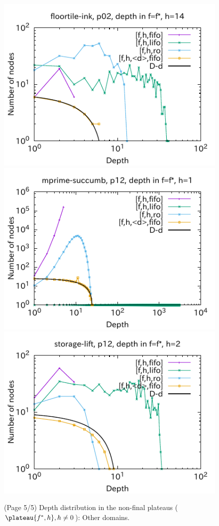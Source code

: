 \begin{figure}[htbp]
\includegraphics{img/output-lmcut/floortile-ink/p02-14.pdf}
\includegraphics{img/output-lmcut/mprime-succumb/p12-1.pdf}
\includegraphics{img/output-lmcut/storage-lift/p12-2.pdf}
 \caption{(Page 5/5) Depth distribution in the non-final plateaus ($\plateau{f^*,h}, h\not=0$): Other domains.}
 \label{fig:depth-histogram5}
\end{figure}

